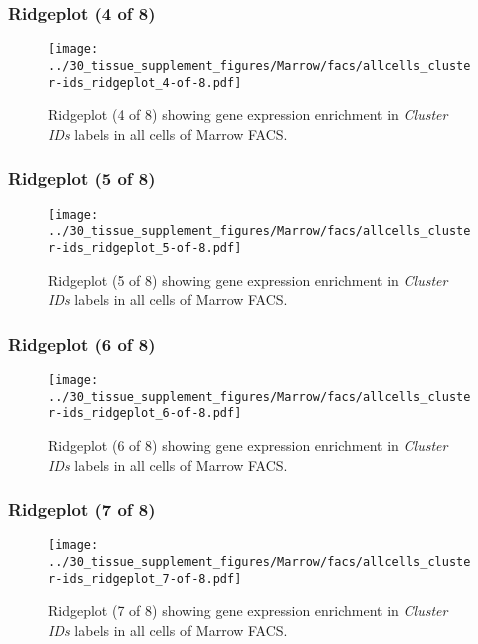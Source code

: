 \clearpage

\subsubsection{Ridgeplot (4 of 8)}
\begin{figure}[h]
\centering
\texttt{[image: ../30\_tissue\_supplement\_figures/Marrow/facs/allcells\_cluster-ids\_ridgeplot\_4-of-8.pdf]}

\caption{ Ridgeplot (4 of 8)  showing gene expression enrichment in \emph{Cluster IDs} labels in all cells of Marrow FACS. }
\end{figure}


\clearpage

\subsubsection{Ridgeplot (5 of 8)}
\begin{figure}[h]
\centering
\texttt{[image: ../30\_tissue\_supplement\_figures/Marrow/facs/allcells\_cluster-ids\_ridgeplot\_5-of-8.pdf]}

\caption{ Ridgeplot (5 of 8)  showing gene expression enrichment in \emph{Cluster IDs} labels in all cells of Marrow FACS. }
\end{figure}


\clearpage

\subsubsection{Ridgeplot (6 of 8)}
\begin{figure}[h]
\centering
\texttt{[image: ../30\_tissue\_supplement\_figures/Marrow/facs/allcells\_cluster-ids\_ridgeplot\_6-of-8.pdf]}

\caption{ Ridgeplot (6 of 8)  showing gene expression enrichment in \emph{Cluster IDs} labels in all cells of Marrow FACS. }
\end{figure}


\clearpage

\subsubsection{Ridgeplot (7 of 8)}
\begin{figure}[h]
\centering
\texttt{[image: ../30\_tissue\_supplement\_figures/Marrow/facs/allcells\_cluster-ids\_ridgeplot\_7-of-8.pdf]}

\caption{ Ridgeplot (7 of 8)  showing gene expression enrichment in \emph{Cluster IDs} labels in all cells of Marrow FACS. }
\end{figure}


